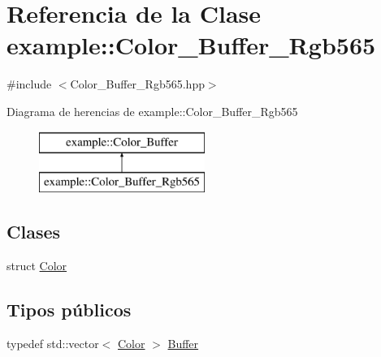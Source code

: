 \hypertarget{classexample_1_1_color___buffer___rgb565}{}\section{Referencia de la Clase example\+::Color\+\_\+\+Buffer\+\_\+\+Rgb565}
\label{classexample_1_1_color___buffer___rgb565}


{\ttfamily \#include $<$Color\+\_\+\+Buffer\+\_\+\+Rgb565.\+hpp$>$}

Diagrama de herencias de example\+::Color\+\_\+\+Buffer\+\_\+\+Rgb565\begin{figure}[H]
\begin{center}
\leavevmode
\includegraphics[height=2.000000cm]{classexample_1_1_color___buffer___rgb565}
\end{center}
\end{figure}
\subsection*{Clases}
\begin{DoxyCompactItemize}
\item 
struct \mbox{\hyperlink{structexample_1_1_color___buffer___rgb565_1_1_color}{Color}}
\end{DoxyCompactItemize}
\subsection*{Tipos públicos}
\begin{DoxyCompactItemize}
\item 
typedef std\+::vector$<$ \mbox{\hyperlink{structexample_1_1_color___buffer___rgb565_1_1_color}{Color}} $>$ \mbox{\hyperlink{classexample_1_1_color___buffer___rgb565_aa16ec2ed2344e9b45c7b11356aac455f}{Buffer}}
\end{DoxyCompactItemize}
